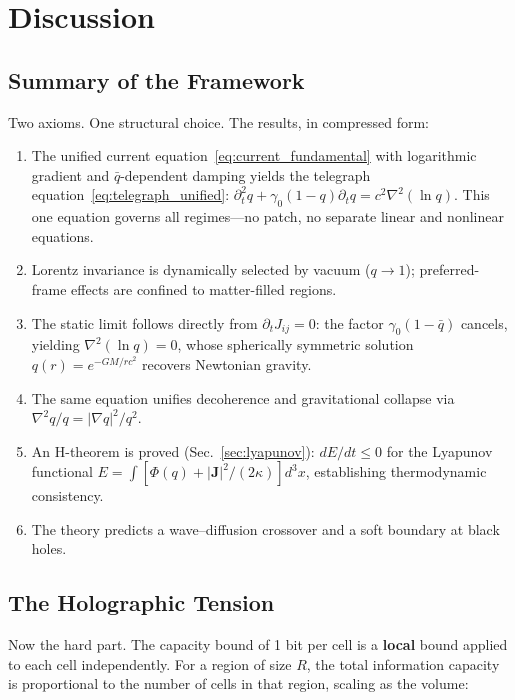 \documentclass[aps,prd,twocolumn,showpacs,superscriptaddress,preprintnumbers]{revtex4-2}
\begin{document}
\section{Discussion}
\label{sec:discussion}

\subsection{Summary of the Framework}

Two axioms. One structural choice. The results, in compressed form:

\begin{enumerate}
    \item The unified current equation~\eqref{eq:current_fundamental} with logarithmic gradient and $\bar{q}$-dependent damping yields the telegraph equation~\eqref{eq:telegraph_unified}: $\partial_t^2 q + \gamma_0(1-q)\partial_t q = c^2\nabla^2(\ln q)$. This one equation governs all regimes---no patch, no separate linear and nonlinear equations.
    \item Lorentz invariance is dynamically selected by vacuum ($q\to1$); preferred-frame effects are confined to matter-filled regions.
    \item The static limit follows directly from $\partial_t J_{ij}=0$: the factor $\gamma_0(1-\bar{q})$ cancels, yielding $\nabla^2(\ln q)=0$, whose spherically symmetric solution $q(r)=e^{-GM/rc^2}$ recovers Newtonian gravity.
    \item The same equation unifies decoherence and gravitational collapse via $\nabla^2 q/q = |\nabla q|^2/q^2$.
    \item An H-theorem is proved (Sec.~\ref{sec:lyapunov}): $dE/dt\leq0$ for the Lyapunov functional $E=\int[\Phi(q)+|\mathbf{J}|^2/(2\kappa)]d^3x$, establishing thermodynamic consistency.
    \item The theory predicts a wave--diffusion crossover and a soft boundary at black holes.
\end{enumerate}

\subsection{The Holographic Tension}
\label{sec:holographic}

Now the hard part.
The capacity bound of 1 bit per cell is a \textbf{local} bound applied to each cell independently.
For a region of size $R$, the total information capacity is proportional to the number of cells in that region, scaling as the volume:
\end{document}
